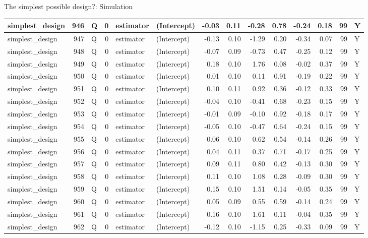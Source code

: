 \documentclass[
  11pt,
  ignorenonframetext,
]{beamer}
\begin{document}
\begin{frame}[fragile]{The simplest possible design?: Simulation}
\begin{tabular}{l|r|l|r|l|l|r|r|r|r|r|r|r|l}
\hline
simplest\_design & 946 & Q & 0 & estimator & (Intercept) & -0.03 & 0.11 & -0.28 & 0.78 & -0.24 & 0.18 & 99 & Y\\
\hline
simplest\_design & 947 & Q & 0 & estimator & (Intercept) & -0.13 & 0.10 & -1.29 & 0.20 & -0.34 & 0.07 & 99 & Y\\
\hline
simplest\_design & 948 & Q & 0 & estimator & (Intercept) & -0.07 & 0.09 & -0.73 & 0.47 & -0.25 & 0.12 & 99 & Y\\
\hline
simplest\_design & 949 & Q & 0 & estimator & (Intercept) & 0.18 & 0.10 & 1.76 & 0.08 & -0.02 & 0.37 & 99 & Y\\
\hline
simplest\_design & 950 & Q & 0 & estimator & (Intercept) & 0.01 & 0.10 & 0.11 & 0.91 & -0.19 & 0.22 & 99 & Y\\
\hline
simplest\_design & 951 & Q & 0 & estimator & (Intercept) & 0.10 & 0.11 & 0.92 & 0.36 & -0.12 & 0.33 & 99 & Y\\
\hline
simplest\_design & 952 & Q & 0 & estimator & (Intercept) & -0.04 & 0.10 & -0.41 & 0.68 & -0.23 & 0.15 & 99 & Y\\
\hline
simplest\_design & 953 & Q & 0 & estimator & (Intercept) & -0.01 & 0.09 & -0.10 & 0.92 & -0.18 & 0.17 & 99 & Y\\
\hline
simplest\_design & 954 & Q & 0 & estimator & (Intercept) & -0.05 & 0.10 & -0.47 & 0.64 & -0.24 & 0.15 & 99 & Y\\
\hline
simplest\_design & 955 & Q & 0 & estimator & (Intercept) & 0.06 & 0.10 & 0.62 & 0.54 & -0.14 & 0.26 & 99 & Y\\
\hline
simplest\_design & 956 & Q & 0 & estimator & (Intercept) & 0.04 & 0.11 & 0.37 & 0.71 & -0.17 & 0.25 & 99 & Y\\
\hline
simplest\_design & 957 & Q & 0 & estimator & (Intercept) & 0.09 & 0.11 & 0.80 & 0.42 & -0.13 & 0.30 & 99 & Y\\
\hline
simplest\_design & 958 & Q & 0 & estimator & (Intercept) & 0.11 & 0.10 & 1.08 & 0.28 & -0.09 & 0.30 & 99 & Y\\
\hline
simplest\_design & 959 & Q & 0 & estimator & (Intercept) & 0.15 & 0.10 & 1.51 & 0.14 & -0.05 & 0.35 & 99 & Y\\
\hline
simplest\_design & 960 & Q & 0 & estimator & (Intercept) & 0.05 & 0.09 & 0.55 & 0.59 & -0.14 & 0.24 & 99 & Y\\
\hline
simplest\_design & 961 & Q & 0 & estimator & (Intercept) & 0.16 & 0.10 & 1.61 & 0.11 & -0.04 & 0.35 & 99 & Y\\
\hline
simplest\_design & 962 & Q & 0 & estimator & (Intercept) & -0.12 & 0.10 & -1.15 & 0.25 & -0.33 & 0.09 & 99 & Y\\

\end{tabular}
\end{frame}
\end{document}
